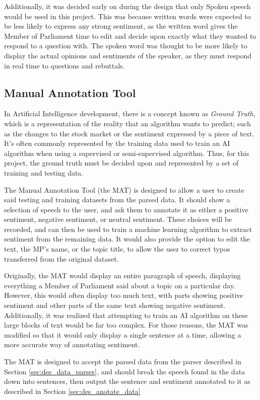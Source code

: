 Additionally, it was decided early on during the design that only Spoken speech would be used in this project. This was because written words were expected to be less likely to express any strong sentiment, as the written word gives the Member of Parliament time to edit and decide upon exactly what they wanted to respond to a question with. The spoken word was thought to be more likely to display the actual opinions and sentiments of the speaker, as they must respond in real time to questions and rebuttals.

\subsection{Manual Annotation Tool}
\label{sec:des_annotation_tool}
In Artificial Intelligence development, there is a concept known as \emph{Ground Truth}, which is a representation of the reality that an algorithm wants to predict; such as the changes to the stock market or the sentiment expressed by a piece of text. It's often commonly represented by the training data used to train an AI algorithm when using a supervised or semi-supervised algorithm. Thus, for this project, the ground truth must be decided upon and represented by a set of training and testing data.

The Manual Annotation Tool (the MAT) is designed to allow a user to create said testing and training datasets from the parsed data. It should show a selection of speech to the user, and ask them to annotate it as either a positive sentiment, negative sentiment, or neutral sentiment. These choices will be recorded, and can then be used to train a machine learning algorithm to extract sentiment from the remaining data. It would also provide the option to edit the text, the MP's name, or the topic title, to allow the user to correct typos transferred from the original dataset.

Originally, the MAT would display an entire paragraph of speech, displaying everything a Member of Parliament said about a topic on a particular day. However, this would often display too much text, with parts showing positive sentiment and other parts of the same text showing negative sentiment. Additionally, it was realized that attempting to train an AI algorithm on these large blocks of text would be far too complex. For those reasons, the MAT was modified so that it would only display a single sentence at a time, allowing a more accurate way of annotating sentiment.

The MAT is designed to accept the parsed data from the parser described in Section \ref{sec:des_data_parser}, and should break the speech found in the data down into sentences, then output the sentence and sentiment annotated to it as described in Section \ref{sec:des_anotate_data}

